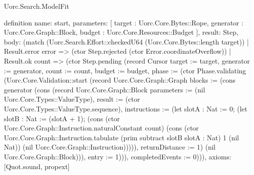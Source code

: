 \begin{lexlean}{Uorc.Search.ModelFit}
\begin{semanticmodule}
definition{
  name: start,
  parameters: [
    target : Uorc.Core.Bytes::Rope,
    generator : Uorc.Core.Graph::Block,
    budget : Uorc.Core.Resources::Budget
  ],
  result: Step,
  body: (match (Uorc.Search.Effort::checkedU64 (Uorc.Core.Bytes::length target))
    | Result.error error => (ctor Step.rejected (ctor Error.coordinateOverflow))
    | Result.ok count => (ctor Step.pending (record Cursor {target := target, generator := generator, count := count, budget := budget, phase := (ctor Phase.validating (Uorc.Core.Validation::start (record Uorc.Core.Graph::Graph {blocks := (cons generator (cons (record Uorc.Core.Graph::Block {parameters := (nil Uorc.Core.Types::ValueType), result := (ctor Uorc.Core.Types::ValueType.sequence), instructions := (let slotA : Nat := 0; (let slotB : Nat := (slotA + 1); (cons (ctor Uorc.Core.Graph::Instruction.naturalConstant count) (cons (ctor Uorc.Core.Graph::Instruction.tabulate (prim subtract slotB slotA : Nat) 1 (nil Nat)) (nil Uorc.Core.Graph::Instruction))))), returnDistance := 1}) (nil Uorc.Core.Graph::Block))), entry := 1}))), completedEvents := 0}))),
  axioms: [Quot.sound, propext]
}


\end{semanticmodule}
\end{lexlean}
